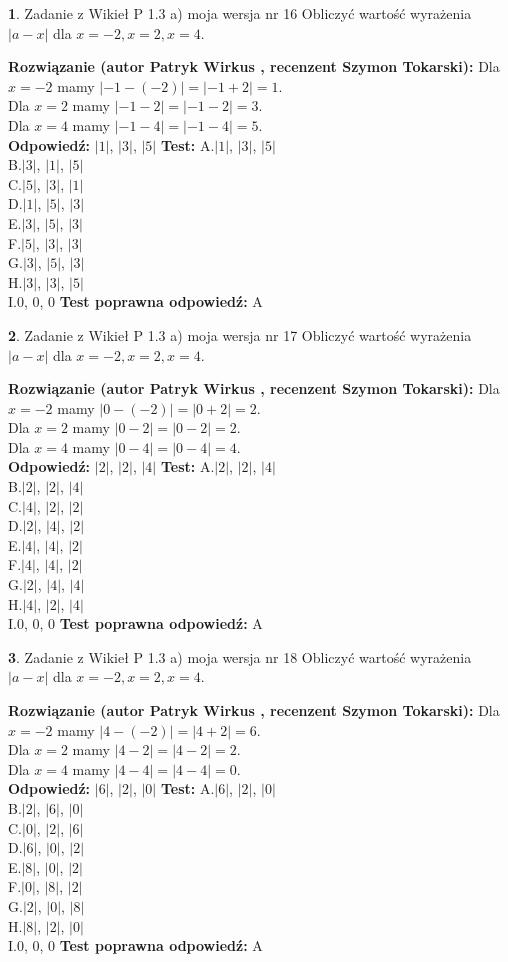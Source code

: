 \documentclass[12pt, a4paper]{article}
\theoremstyle{definition} %
\newtheorem{zad}{}
\newcommand{\zadStart}[1]{\begin{zad}#1\newline}
\newcommand{\zadStop}{\end{zad}}
\newcommand{\rozwStart}[2]{\noindent \textbf{Rozwiązanie (autor #1 , recenzent #2): }\newline}
\newcommand{\rozwStop}{\newline}
\newcommand{\odpStart}{\noindent \textbf{Odpowiedź:}\newline}
\newcommand{\odpStop}{\newline}
\newcommand{\testStart}{\noindent \textbf{Test:}\newline}
\newcommand{\testStop}{\newline}
\newcommand{\kluczStart}{\noindent \textbf{Test poprawna odpowiedź:}\newline}
\newcommand{\kluczStop}{\newline}
\begin{document}
\zadStart{Zadanie z Wikieł P 1.3 a) moja wersja nr 16}
Obliczyć wartość wyrażenia $|a - x|$ dla $x=-2,x=2,x=4$.
\zadStop
\rozwStart{Patryk Wirkus}{Szymon Tokarski}
Dla $x = -2$ mamy $|-1 - (-2)| = |-1 + 2| = 1$.\\
Dla $x = 2$ mamy $|-1 - 2| = |-1 - 2| = 3$.\\
Dla $x = 4$ mamy $|-1 - 4| = |-1 - 4| = 5$.\\
\rozwStop
\odpStart
$|1|$, $|3|$, $|5|$
\odpStop
\testStart
A.$|1|$, $|3|$, $|5|$\\
B.$|3|$, $|1|$, $|5|$\\
C.$|5|$, $|3|$, $|1|$\\
D.$|1|$, $|5|$, $|3|$\\
E.$|3|$, $|5|$, $|3|$\\
F.$|5|$, $|3|$, $|3|$\\
G.$|3|$, $|5|$, $|3|$\\
H.$|3|$, $|3|$, $|5|$\\
I.$0$, $0$, $0$
\testStop
\kluczStart
A
\kluczStop



\zadStart{Zadanie z Wikieł P 1.3 a) moja wersja nr 17}
Obliczyć wartość wyrażenia $|a - x|$ dla $x=-2,x=2,x=4$.
\zadStop
\rozwStart{Patryk Wirkus}{Szymon Tokarski}
Dla $x = -2$ mamy $|0 - (-2)| = |0 + 2| = 2$.\\
Dla $x = 2$ mamy $|0 - 2| = |0 - 2| = 2$.\\
Dla $x = 4$ mamy $|0 - 4| = |0 - 4| = 4$.\\
\rozwStop
\odpStart
$|2|$, $|2|$, $|4|$
\odpStop
\testStart
A.$|2|$, $|2|$, $|4|$\\
B.$|2|$, $|2|$, $|4|$\\
C.$|4|$, $|2|$, $|2|$\\
D.$|2|$, $|4|$, $|2|$\\
E.$|4|$, $|4|$, $|2|$\\
F.$|4|$, $|4|$, $|2|$\\
G.$|2|$, $|4|$, $|4|$\\
H.$|4|$, $|2|$, $|4|$\\
I.$0$, $0$, $0$
\testStop
\kluczStart
A
\kluczStop



\zadStart{Zadanie z Wikieł P 1.3 a) moja wersja nr 18}
Obliczyć wartość wyrażenia $|a - x|$ dla $x=-2,x=2,x=4$.
\zadStop
\rozwStart{Patryk Wirkus}{Szymon Tokarski}
Dla $x = -2$ mamy $|4 - (-2)| = |4 + 2| = 6$.\\
Dla $x = 2$ mamy $|4 - 2| = |4 - 2| = 2$.\\
Dla $x = 4$ mamy $|4 - 4| = |4 - 4| = 0$.\\
\rozwStop
\odpStart
$|6|$, $|2|$, $|0|$
\odpStop
\testStart
A.$|6|$, $|2|$, $|0|$\\
B.$|2|$, $|6|$, $|0|$\\
C.$|0|$, $|2|$, $|6|$\\
D.$|6|$, $|0|$, $|2|$\\
E.$|8|$, $|0|$, $|2|$\\
F.$|0|$, $|8|$, $|2|$\\
G.$|2|$, $|0|$, $|8|$\\
H.$|8|$, $|2|$, $|0|$\\
I.$0$, $0$, $0$
\testStop
\kluczStart
A
\kluczStop
\end{document}
